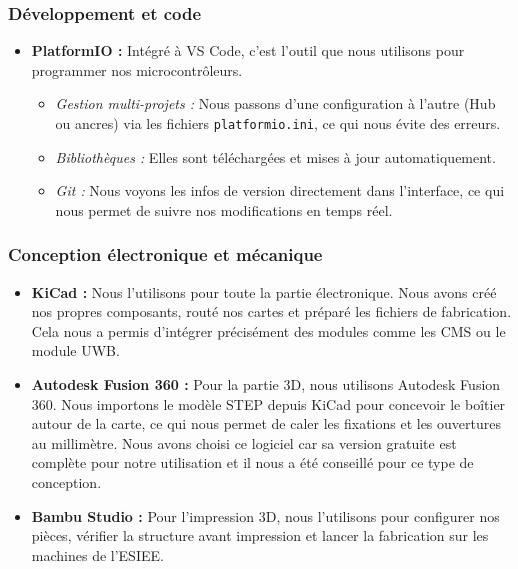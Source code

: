 \subsubsection{Développement et code}
\begin{itemize}
    \item \textbf{PlatformIO \cite{plateformio}:} Intégré à VS Code, c'est l'outil que nous utilisons pour programmer nos microcontrôleurs.
    \begin{itemize}
        \item \textit{Gestion multi-projets :} Nous passons d'une configuration à l'autre (Hub ou ancres) via les fichiers \texttt{platformio.ini}, ce qui nous évite des erreurs.
        \item \textit{Bibliothèques :} Elles sont téléchargées et mises à jour automatiquement.
        \item \textit{Git :} Nous voyons les infos de version directement dans l'interface, ce qui nous permet de suivre nos modifications en temps réel.
    \end{itemize}
\end{itemize}

\subsubsection{Conception électronique et mécanique}
\begin{itemize}
    \item \textbf{KiCad \cite{KiCad} :} Nous l'utilisons pour toute la partie électronique. Nous avons créé nos propres composants, routé nos cartes et préparé les fichiers de fabrication. Cela nous a permis d'intégrer précisément des modules comme les CMS ou le module UWB.
    \item \textbf{Autodesk Fusion 360 \cite{Fusion360}:}  Pour la partie 3D, nous utilisons Autodesk Fusion 360. Nous importons le modèle STEP depuis KiCad pour concevoir le boîtier autour de la carte, ce qui nous permet de caler les fixations et les ouvertures au millimètre. Nous avons choisi ce logiciel car sa version gratuite est complète pour notre utilisation et il nous a été conseillé pour ce type de conception.
    \item \textbf{Bambu Studio \cite{Bambu_Studio}:} Pour l'impression 3D, nous l'utilisons pour configurer nos pièces, vérifier la structure avant impression et lancer la fabrication sur les machines de l'ESIEE.
\end{itemize}

